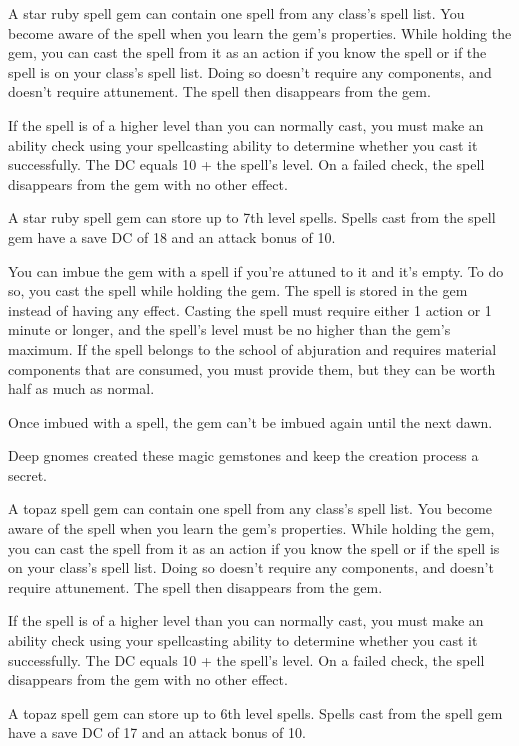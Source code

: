 \documentclass[10pt,a4paper,twoside,bg=print,twocolumn,openany,nodeprecatedcode]{dndbook}
\begin{document}
A star ruby spell gem can contain one spell from any class's spell list. You become aware of the spell when you learn the gem's properties. While holding the gem, you can cast the spell from it as an action if you know the spell or if the spell is on your class's spell list. Doing so doesn't require any components, and doesn't require attunement. The spell then disappears from the gem.

If the spell is of a higher level than you can normally cast, you must make an ability check using your spellcasting ability to determine whether you cast it successfully. The DC equals 10 + the spell's level. On a failed check, the spell disappears from the gem with no other effect.

A star ruby spell gem can store up to 7th level spells. Spells cast from the spell gem have a save DC of 18 and an attack bonus of 10.

You can imbue the gem with a spell if you're attuned to it and it's empty. To do so, you cast the spell while holding the gem. The spell is stored in the gem instead of having any effect. Casting the spell must require either 1 action or 1 minute or longer, and the spell's level must be no higher than the gem's maximum. If the spell belongs to the school of abjuration and requires material components that are consumed, you must provide them, but they can be worth half as much as normal.

Once imbued with a spell, the gem can't be imbued again until the next dawn.

Deep gnomes created these magic gemstones and keep the creation process a secret.

A topaz spell gem can contain one spell from any class's spell list. You become aware of the spell when you learn the gem's properties. While holding the gem, you can cast the spell from it as an action if you know the spell or if the spell is on your class's spell list. Doing so doesn't require any components, and doesn't require attunement. The spell then disappears from the gem.

If the spell is of a higher level than you can normally cast, you must make an ability check using your spellcasting ability to determine whether you cast it successfully. The DC equals 10 + the spell's level. On a failed check, the spell disappears from the gem with no other effect.

A topaz spell gem can store up to 6th level spells. Spells cast from the spell gem have a save DC of 17 and an attack bonus of 10.
\end{document}
